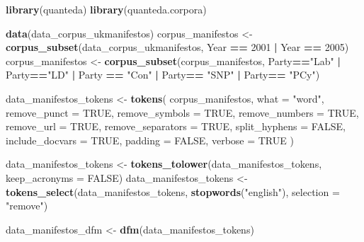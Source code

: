 \documentclass[
]{book}
\newenvironment{Shaded}{\begin{snugshade}}{\end{snugshade}}
\newcommand{\AttributeTok}[1]{\textcolor[rgb]{0.13,0.29,0.53}{#1}}
\newcommand{\ConstantTok}[1]{\textcolor[rgb]{0.56,0.35,0.01}{#1}}
\newcommand{\DecValTok}[1]{\textcolor[rgb]{0.00,0.00,0.81}{#1}}
\newcommand{\FunctionTok}[1]{\textcolor[rgb]{0.13,0.29,0.53}{\textbf{#1}}}
\newcommand{\NormalTok}[1]{#1}
\newcommand{\OtherTok}[1]{\textcolor[rgb]{0.56,0.35,0.01}{#1}}
\newcommand{\SpecialCharTok}[1]{\textcolor[rgb]{0.81,0.36,0.00}{\textbf{#1}}}
\newcommand{\StringTok}[1]{\textcolor[rgb]{0.31,0.60,0.02}{#1}}
\begin{document}
\begin{Shaded}
\begin{Highlighting}[]
\FunctionTok{library}\NormalTok{(quanteda)}
\FunctionTok{library}\NormalTok{(quanteda.corpora)}

\FunctionTok{data}\NormalTok{(data\_corpus\_ukmanifestos)}
\NormalTok{corpus\_manifestos }\OtherTok{\textless{}{-}} \FunctionTok{corpus\_subset}\NormalTok{(data\_corpus\_ukmanifestos, Year }\SpecialCharTok{==} \DecValTok{2001} \SpecialCharTok{|}\NormalTok{ Year }\SpecialCharTok{==} \DecValTok{2005}\NormalTok{)}
\NormalTok{corpus\_manifestos }\OtherTok{\textless{}{-}} \FunctionTok{corpus\_subset}\NormalTok{(corpus\_manifestos, Party}\SpecialCharTok{==}\StringTok{"Lab"} \SpecialCharTok{|}\NormalTok{ Party}\SpecialCharTok{==}\StringTok{"LD"} \SpecialCharTok{|}\NormalTok{ Party }\SpecialCharTok{==} \StringTok{"Con"} \SpecialCharTok{|}\NormalTok{ Party}\SpecialCharTok{==} \StringTok{"SNP"} \SpecialCharTok{|}\NormalTok{ Party}\SpecialCharTok{==} \StringTok{"PCy"}\NormalTok{)}

\NormalTok{data\_manifestos\_tokens }\OtherTok{\textless{}{-}} \FunctionTok{tokens}\NormalTok{(}
\NormalTok{ corpus\_manifestos,}
 \AttributeTok{what =} \StringTok{"word"}\NormalTok{,}
 \AttributeTok{remove\_punct =} \ConstantTok{TRUE}\NormalTok{,}
 \AttributeTok{remove\_symbols =} \ConstantTok{TRUE}\NormalTok{,}
 \AttributeTok{remove\_numbers =} \ConstantTok{TRUE}\NormalTok{,}
 \AttributeTok{remove\_url =} \ConstantTok{TRUE}\NormalTok{,}
 \AttributeTok{remove\_separators =} \ConstantTok{TRUE}\NormalTok{,}
 \AttributeTok{split\_hyphens =} \ConstantTok{FALSE}\NormalTok{,}
 \AttributeTok{include\_docvars =} \ConstantTok{TRUE}\NormalTok{,}
 \AttributeTok{padding =} \ConstantTok{FALSE}\NormalTok{,}
 \AttributeTok{verbose =} \ConstantTok{TRUE}
\NormalTok{)}

\NormalTok{data\_manifestos\_tokens }\OtherTok{\textless{}{-}} \FunctionTok{tokens\_tolower}\NormalTok{(data\_manifestos\_tokens, }\AttributeTok{keep\_acronyms =} \ConstantTok{FALSE}\NormalTok{)}
\NormalTok{data\_manifestos\_tokens }\OtherTok{\textless{}{-}} \FunctionTok{tokens\_select}\NormalTok{(data\_manifestos\_tokens, }\FunctionTok{stopwords}\NormalTok{(}\StringTok{"english"}\NormalTok{), }\AttributeTok{selection =} \StringTok{"remove"}\NormalTok{)}

\NormalTok{data\_manifestos\_dfm }\OtherTok{\textless{}{-}} \FunctionTok{dfm}\NormalTok{(data\_manifestos\_tokens)}
\end{Highlighting}
\end{Shaded}
\end{document}
